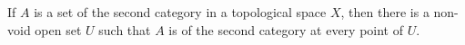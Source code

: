 If $A$ is a set of the second category in a topological space $X$, then there is a non-void open set $U$ such that $A$ is of the second category at every point of $U$.

